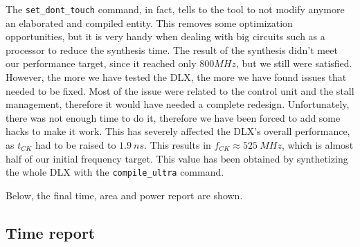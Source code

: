 The \verb|set_dont_touch| command, in fact, tells to the tool to not modify anymore an elaborated and compiled entity. This removes some optimization opportunities, but it is very handy
when dealing with big circuits such as a processor to reduce the synthesis time.
The result of the synthesis didn't meet our performance target, since it reached only $800 MHz$, but we still were satisfied. However, the more we have tested the DLX, the more we have found
issues that needed to be fixed. Most of the issue were related to the control unit and the stall management, therefore it would have needed a complete redesign. Unfortunately, there was not enough
time to do it, therefore we have been forced to add some hacks to make it work. This has severely affected the DLX's overall performance, as $t_{CK}$ had to be raised to $1.9\ ns$. This results in
$f_{CK} \approx 525\ MHz$, which is almost half of our initial frequency target. This value has been obtained by synthetizing the whole DLX with the \verb|compile_ultra| command.

Below, the final time, area and power report are shown.

\subsection{Time report}

